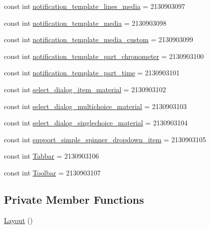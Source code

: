\begin{DoxyCompactItemize}
\item 
const int \mbox{\hyperlink{class_f_w_p_s___app_1_1_droid_1_1_resource_1_1_layout_a9da38bc2b476ec00626955a61d25e0f2}{notification\+\_\+template\+\_\+lines\+\_\+media}} = 2130903097
\item 
const int \mbox{\hyperlink{class_f_w_p_s___app_1_1_droid_1_1_resource_1_1_layout_a01e7bcd753dba36de751a22e7c3fde6f}{notification\+\_\+template\+\_\+media}} = 2130903098
\item 
const int \mbox{\hyperlink{class_f_w_p_s___app_1_1_droid_1_1_resource_1_1_layout_af13ca7a99d8c465273fb15fd22a1b071}{notification\+\_\+template\+\_\+media\+\_\+custom}} = 2130903099
\item 
const int \mbox{\hyperlink{class_f_w_p_s___app_1_1_droid_1_1_resource_1_1_layout_aa81e09e7f3ad7811467ebfe66f5bfcc5}{notification\+\_\+template\+\_\+part\+\_\+chronometer}} = 2130903100
\item 
const int \mbox{\hyperlink{class_f_w_p_s___app_1_1_droid_1_1_resource_1_1_layout_a9d324ed9ca1cfab916f19712f8dfbbc0}{notification\+\_\+template\+\_\+part\+\_\+time}} = 2130903101
\item 
const int \mbox{\hyperlink{class_f_w_p_s___app_1_1_droid_1_1_resource_1_1_layout_a76eef723455f30e827c6dfcc3d3dc776}{select\+\_\+dialog\+\_\+item\+\_\+material}} = 2130903102
\item 
const int \mbox{\hyperlink{class_f_w_p_s___app_1_1_droid_1_1_resource_1_1_layout_a28bd62a995cd1bc78ca74bd372d97c7e}{select\+\_\+dialog\+\_\+multichoice\+\_\+material}} = 2130903103
\item 
const int \mbox{\hyperlink{class_f_w_p_s___app_1_1_droid_1_1_resource_1_1_layout_a88d4b85affb5e654bc95de53bf23a325}{select\+\_\+dialog\+\_\+singlechoice\+\_\+material}} = 2130903104
\item 
const int \mbox{\hyperlink{class_f_w_p_s___app_1_1_droid_1_1_resource_1_1_layout_a4d85783616ecb9494dcaa92de07d5df6}{support\+\_\+simple\+\_\+spinner\+\_\+dropdown\+\_\+item}} = 2130903105
\item 
const int \mbox{\hyperlink{class_f_w_p_s___app_1_1_droid_1_1_resource_1_1_layout_ad05187860cb9299798c7452472bdb9f7}{Tabbar}} = 2130903106
\item 
const int \mbox{\hyperlink{class_f_w_p_s___app_1_1_droid_1_1_resource_1_1_layout_a709350f8bf469c079d83d08e567bd237}{Toolbar}} = 2130903107
\end{DoxyCompactItemize}
\subsection*{Private Member Functions}
\begin{DoxyCompactItemize}
\item 
\mbox{\hyperlink{class_f_w_p_s___app_1_1_droid_1_1_resource_1_1_layout_a77f4ee3ca0736669288a19a0231dd919}{Layout}} ()
\end{DoxyCompactItemize}

